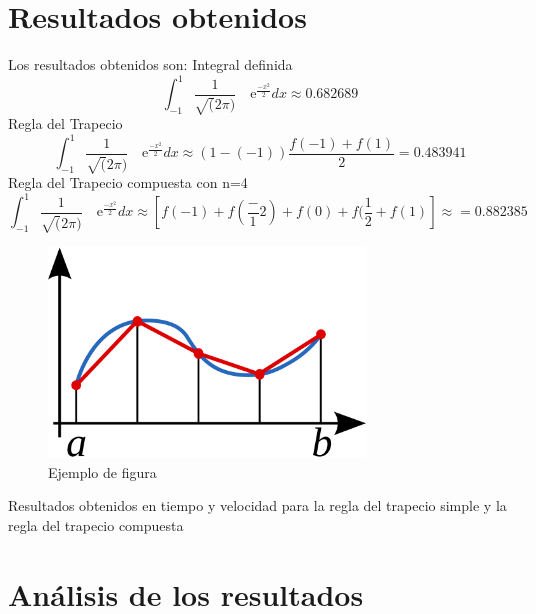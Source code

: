 \section{Resultados obtenidos}
\label{3:sec:3}
\parindent=1cm
\raggedright
Los resultados obtenidos son:
Integral definida 
\[
\int_{-1}^{1} \frac{1}{\sqrt(2\pi)} \quad\text{e}^{\frac{-x^2}{2}}dx\approx0.682689 
\]
Regla del Trapecio
\[
\int_{-1}^{1} \frac{1}{\sqrt(2\pi)} \quad\text{e}^{\frac{-x^2}{2}}dx\approx\left(1-(-1)\right)\frac{f(-1)+f(1)}{2}=0.483941
\]
Regla del Trapecio compuesta con n=4
\[
\int_{-1}^{1} \frac{1}{\sqrt(2\pi)} \quad\text{e}^{\frac{-x^2}{2}}dx\approx\left[f(-1) + f(\frac-{1}{2}) + f(0) + f(\frac{1}{2} + f(1)\right]\approx=0.882385
\]
\begin{figure}[!th]
\begin{center}
\includegraphics[width=0.75\textwidth]{images/Regla-Trap-compuesta.eps}
\caption{Ejemplo de figura}
\label{fig:1}
\end{center}
\end{figure}
Resultados obtenidos en tiempo y velocidad para la regla del trapecio simple y la regla del trapecio compuesta


\section{An\'alisis de los resultados}
\label{3:sec:4}
\parindent=1cm
\raggedright
 

